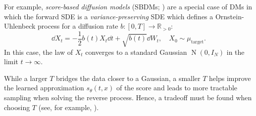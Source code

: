 For example, \textit{score-based diffusion models} (SBDMs; \citealp[Equation 11]{song2021scorebasedgenerativemodelingstochastic}) are a special case of DMs in which the forward SDE is a \textit{variance-preserving} SDE which defines a Ornstein-Uhlenbeck process \citep{uhlenbeck1930theory} for a diffusion rate \(b : [0, T] \to \mathbb{R}_{>0}\):
\[
  \dd{X_{t}} = - \frac{1}{2} b(t) X_{t} \dd{t} + \sqrt{b(t)} \dd{W_{t}}, \quad X_{0} \sim \mu_{\text{target}}.
\]
In this case, the law of \(X_{t}\) converges to a standard Gaussian \(\operatorname{N}(0, I_{N})\) in the limit \(t \to \infty\).

While a larger \(T\) bridges the data closer to a Gaussian, a smaller \(T\) helps improve the learned approximation \(s_{\theta}(t, x)\) of the score and leads to more tractable sampling when solving the reverse process. Hence, a tradeoff must be found when choosing \(T\) (see, for example, \citealp{franzese2023much}).

